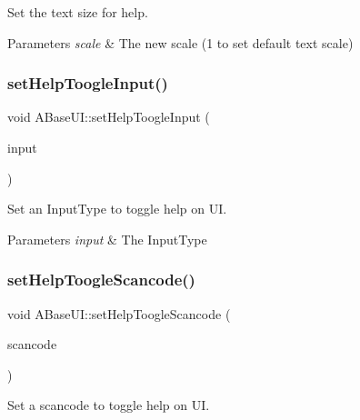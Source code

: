 Set the text size for help. 


\begin{DoxyParams}{Parameters}
{\em scale} & The new scale (1 to set default text scale) \\
\hline
\end{DoxyParams}
\mbox{\label{class_a_base_u_i_ac991af43c13dc7082a7bdfe1f231206d}} 
\subsubsection{\texorpdfstring{set\+Help\+Toogle\+Input()}{setHelpToogleInput()}}
{\footnotesize\ttfamily void A\+Base\+U\+I\+::set\+Help\+Toogle\+Input (\begin{DoxyParamCaption}\item[{Input\+Type\+::\+Enum}]{input }\end{DoxyParamCaption})\hspace{0.3cm}{\ttfamily [static]}}



Set an Input\+Type to toggle help on UI. 


\begin{DoxyParams}{Parameters}
{\em input} & The Input\+Type \\
\hline
\end{DoxyParams}
\mbox{\label{class_a_base_u_i_acb9967f11c239efc3b8536866a52cdc5}} 
\subsubsection{\texorpdfstring{set\+Help\+Toogle\+Scancode()}{setHelpToogleScancode()}}
{\footnotesize\ttfamily void A\+Base\+U\+I\+::set\+Help\+Toogle\+Scancode (\begin{DoxyParamCaption}\item[{S\+D\+L\+\_\+\+Scancode}]{scancode }\end{DoxyParamCaption})\hspace{0.3cm}{\ttfamily [static]}}



Set a scancode to toggle help on UI. 


